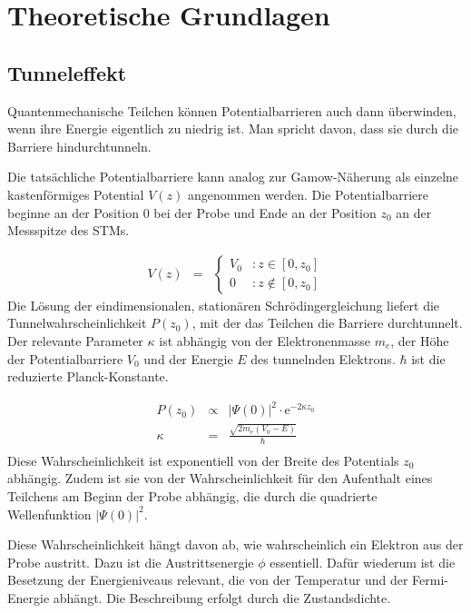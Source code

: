 \documentclass[12pt,a4paper]{scrartcl}
\numberwithin{equation}{section} %
\renewcommand{\[}{} %
\renewcommand{\]}{\noindent} %
\begin{document}
\hypertarget{theoretische-grundlagen}{%
\section{Theoretische Grundlagen}\label{theoretische-grundlagen}}

\hypertarget{tunneleffekt}{%
\subsection{Tunneleffekt}\label{tunneleffekt}}

Quantenmechanische Teilchen können Potentialbarrieren auch dann
überwinden, wenn ihre Energie eigentlich zu niedrig ist. Man spricht
davon, dass sie durch die Barriere hindurchtunneln.

Die tatsächliche Potentialbarriere kann analog zur Gamow-Näherung als
einzelne kastenförmiges Potential \(V(z)\) angenommen werden. Die
Potentialbarriere beginne an der Position \(0\) bei der Probe und Ende
an der Position \(z_0\) an der Messspitze des STMs.

\[
\begin{eqnarray}
    V(z) &=&
        \begin{cases}
            V_0 &: z \in [0, z_0] \\
            0 &: z \notin [0, z_0]
        \end{cases}
\end{eqnarray}
\] Die Lösung der eindimensionalen, stationären Schrödingergleichung
liefert die Tunnelwahrscheinlichkeit \(P(z_0)\), mit der das Teilchen
die Barriere durchtunnelt. Der relevante Parameter \(\kappa\) ist
abhängig von der Elektronenmasse \(m_e\), der Höhe der Potentialbarriere
\(V_0\) und der Energie \(E\) des tunnelnden Elektrons. \(\hbar\) ist
die reduzierte Planck-Konstante.

\[
\begin{eqnarray}
    P(z_0) &\propto& |\Psi(0)|^2 \cdot \mathrm e^{-2\kappa z_0} \\
    \kappa &=& \frac{\sqrt{2m_e(V_0 - E)}}{\hbar} \label{kappa} \\
\end{eqnarray}
\] Diese Wahrscheinlichkeit ist exponentiell von der Breite des
Potentials \(z_0\) abhängig. Zudem ist sie von der Wahrscheinlichkeit
für den Aufenthalt eines Teilchens am Beginn der Probe abhängig, die
durch die quadrierte Wellenfunktion \(|\Psi(0)|^2\).

Diese Wahrscheinlichkeit hängt davon ab, wie wahrscheinlich ein Elektron
aus der Probe austritt. Dazu ist die Austrittsenergie \(\phi\)
essentiell. Dafür wiederum ist die Besetzung der Energieniveaus
relevant, die von der Temperatur und der Fermi-Energie abhängt. Die
Beschreibung erfolgt durch die Zustandsdichte.
\end{document}
